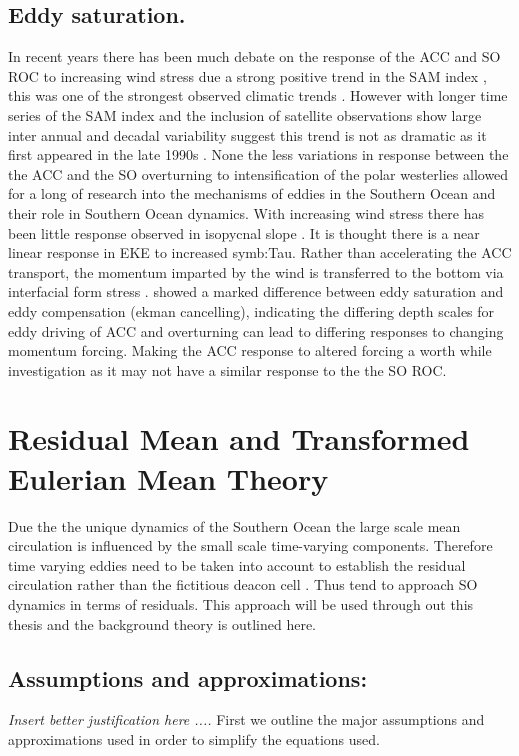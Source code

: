 \subsection{Eddy saturation.}

In recent years there has been much debate on the response of the ACC and SO ROC to increasing wind stress due a strong positive trend in the \gls{SAM} index \citep{thompson2002}, this was one of the strongest observed climatic trends \cite{Sallee2010}. However with longer time series of the SAM index and the inclusion of satellite observations show large inter annual and decadal variability suggest this trend is not as dramatic as it first appeared in the late 1990s \citep{Hogg2015}. None the less variations in response between the the ACC and the SO overturning to intensification of the polar westerlies allowed for a long of research into the mechanisms of eddies in the Southern Ocean and their role in Southern Ocean dynamics. With increasing wind stress there has been little response observed in isopycnal slope \citep{boning2008}. It is thought there is a near linear response in \gls{EKE} to increased \gls{symb:Tau}. Rather than accelerating the ACC transport, the momentum imparted by the wind is transferred to the bottom via interfacial form stress \cite{meredith2006}. \citet{morrison2013} showed a marked difference between eddy saturation and eddy compensation (ekman cancelling), indicating the differing depth scales for eddy driving of ACC and overturning can lead to differing responses to changing momentum forcing. Making the ACC response to altered forcing a worth while investigation as it may not have a similar response to the the SO ROC. 

\section{Residual Mean and Transformed Eulerian Mean Theory}

Due the the unique dynamics of the Southern Ocean the large scale mean circulation is influenced by the small scale time-varying components. Therefore time varying eddies need to be taken into account to establish the residual circulation rather than the fictitious deacon cell \citep{Doos1994}. Thus tend to approach SO dynamics in terms of residuals. This approach will be used through out this thesis and the background theory is outlined here.

\subsection{Assumptions and approximations:}
\textit{Insert better justification here ....}
First we outline the major assumptions and approximations used in order to simplify the equations used.

